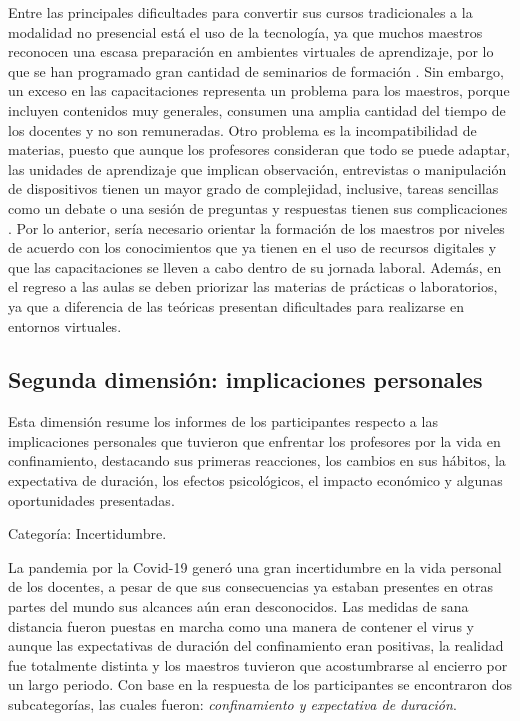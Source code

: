 \documentclass[spanish]{textolivre}
\begin{document}
Entre las principales dificultades para convertir sus cursos tradicionales a la modalidad no presencial está el uso de la tecnología, ya que muchos maestros reconocen una escasa preparación en ambientes virtuales de aprendizaje, por lo que se han programado gran cantidad de seminarios de formación \cite{penuelas_ensenanza_2020}. Sin embargo, un exceso en las capacitaciones representa un problema para los maestros, porque incluyen contenidos muy generales, consumen una amplia cantidad del tiempo de los docentes y no son remuneradas. Otro problema es la incompatibilidad de materias, puesto que aunque los profesores consideran que todo se puede adaptar, las unidades de aprendizaje que implican observación, entrevistas o manipulación de dispositivos tienen un mayor grado de complejidad, inclusive, tareas sencillas como un debate o una sesión de preguntas y respuestas tienen sus complicaciones \cite{van_nuland_covid-19_2020}. Por lo anterior, sería necesario orientar la formación de los maestros por niveles de acuerdo con los conocimientos que ya tienen en el uso de recursos digitales y que las capacitaciones se lleven a cabo dentro de su jornada laboral. Además, en el regreso a las aulas se deben priorizar las materias de prácticas o laboratorios, ya que a diferencia de las teóricas presentan dificultades para realizarse en entornos virtuales.  

\subsection{Segunda dimensión: implicaciones personales}

Esta dimensión resume los informes de los participantes respecto a las implicaciones personales que tuvieron que enfrentar los profesores por la vida en confinamiento, destacando sus primeras reacciones, los cambios en sus hábitos, la expectativa de duración, los efectos psicológicos, el impacto económico y algunas oportunidades presentadas.

Categoría: Incertidumbre.

La pandemia por la Covid-19 generó una gran incertidumbre en la vida personal de los docentes, a pesar de que sus consecuencias ya estaban presentes en otras partes del mundo sus alcances aún eran desconocidos. Las medidas de sana distancia fueron puestas en marcha como una manera de contener el virus y aunque las expectativas de duración del confinamiento eran positivas, la realidad fue totalmente distinta y los maestros tuvieron que acostumbrarse al encierro por un largo periodo. Con base en la respuesta de los participantes se encontraron dos subcategorías, las cuales fueron: \textit{confinamiento y expectativa de duración}.
\end{document}

